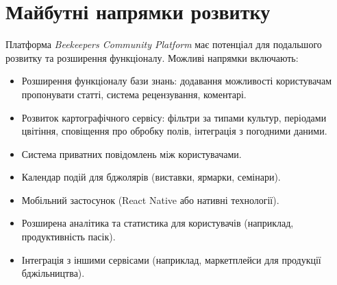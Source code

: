 \section{Майбутні напрямки розвитку}
\label{sec:future_work}
Платформа \textit{Beekeepers Community Platform} має потенціал для подальшого розвитку та розширення функціоналу. Можливі напрямки включають:
\begin{itemize}
    \item Розширення функціоналу бази знань: додавання можливості користувачам пропонувати статті, система рецензування, коментарі.
    \item Розвиток картографічного сервісу: фільтри за типами культур, періодами цвітіння, сповіщення про обробку полів, інтеграція з погодними даними.
    \item Система приватних повідомлень між користувачами.
    \item Календар подій для бджолярів (виставки, ярмарки, семінари).
    \item Мобільний застосунок (React Native або нативні технології).
    \item Розширена аналітика та статистика для користувачів (наприклад, продуктивність пасік).
    \item Інтеграція з іншими сервісами (наприклад, маркетплейси для продукції бджільництва).
\end{itemize} 